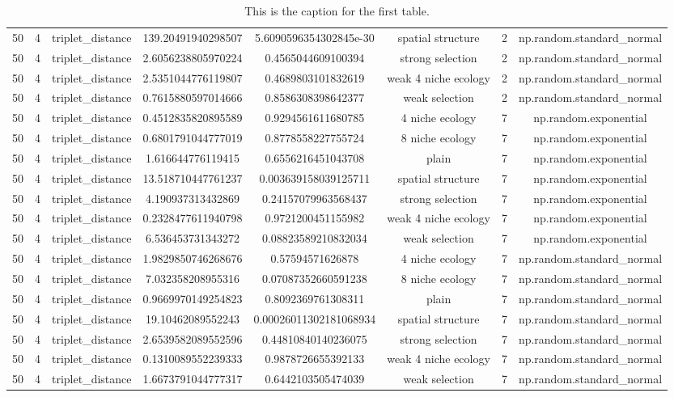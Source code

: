 \begin{table}[h!]
\begin{tabular}{||c c c c c c c c||}
50 & 4 & triplet\_distance & 139.20491940298507 & 5.6090596354302845e-30 & spatial structure & 2 & np.random.standard\_normal \\ 
50 & 4 & triplet\_distance & 2.6056238805970224 & 0.4565044609100394 & strong selection & 2 & np.random.standard\_normal \\ 
50 & 4 & triplet\_distance & 2.5351044776119807 & 0.4689803101832619 & weak 4 niche ecology & 2 & np.random.standard\_normal \\ 
50 & 4 & triplet\_distance & 0.7615880597014666 & 0.8586308398642377 & weak selection & 2 & np.random.standard\_normal \\ 
50 & 4 & triplet\_distance & 0.4512835820895589 & 0.9294561611680785 & 4 niche ecology & 7 & np.random.exponential \\ 
50 & 4 & triplet\_distance & 0.6801791044777019 & 0.8778558227755724 & 8 niche ecology & 7 & np.random.exponential \\ 
50 & 4 & triplet\_distance & 1.616644776119415 & 0.6556216451043708 & plain & 7 & np.random.exponential \\ 
50 & 4 & triplet\_distance & 13.518710447761237 & 0.003639158039125711 & spatial structure & 7 & np.random.exponential \\ 
50 & 4 & triplet\_distance & 4.190937313432869 & 0.24157079963568437 & strong selection & 7 & np.random.exponential \\ 
50 & 4 & triplet\_distance & 0.2328477611940798 & 0.9721200451155982 & weak 4 niche ecology & 7 & np.random.exponential \\ 
50 & 4 & triplet\_distance & 6.536453731343272 & 0.08823589210832034 & weak selection & 7 & np.random.exponential \\ 
50 & 4 & triplet\_distance & 1.9829850746268676 & 0.57594571626878 & 4 niche ecology & 7 & np.random.standard\_normal \\ 
50 & 4 & triplet\_distance & 7.032358208955316 & 0.07087352660591238 & 8 niche ecology & 7 & np.random.standard\_normal \\ 
50 & 4 & triplet\_distance & 0.9669970149254823 & 0.8092369761308311 & plain & 7 & np.random.standard\_normal \\ 
50 & 4 & triplet\_distance & 19.10462089552243 & 0.00026011302181068934 & spatial structure & 7 & np.random.standard\_normal \\ 
50 & 4 & triplet\_distance & 2.6539582089552596 & 0.44810840140236075 & strong selection & 7 & np.random.standard\_normal \\ 
50 & 4 & triplet\_distance & 0.1310089552239333 & 0.9878726655392133 & weak 4 niche ecology & 7 & np.random.standard\_normal \\ 
50 & 4 & triplet\_distance & 1.6673791044777317 & 0.6442103505474039 & weak selection & 7 & np.random.standard\_normal \\ [1ex]
   \hline
  \end{tabular}
  \caption{This is the caption for the first table.}
  \label{reconstruction-error-comparisons-between-regimes-resolutions:1}
\end{table}
